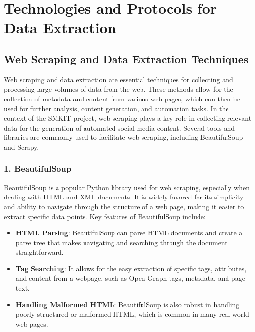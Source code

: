 \section{Technologies and Protocols for Data Extraction}
\label{sec:technologies_and_protocols_for_data_extraction}

\subsection{Web Scraping and Data Extraction Techniques}
\label{subsec:web_scraping_and_data_extraction_techniques}

Web scraping and data extraction are essential techniques for collecting and processing large volumes of data from the web. These methods allow for the collection of metadata and content from various web pages, which can then be used for further analysis, content generation, and automation tasks. In the context of the SMKIT project, web scraping plays a key role in collecting relevant data for the generation of automated social media content. Several tools and libraries are commonly used to facilitate web scraping, including BeautifulSoup and Scrapy.

\subsubsection{1. BeautifulSoup}

BeautifulSoup is a popular Python library used for web scraping, especially when dealing with HTML and XML documents. It is widely favored for its simplicity and ability to navigate through the structure of a web page, making it easier to extract specific data points. Key features of BeautifulSoup include:

\begin{itemize}
    \item \textbf{HTML Parsing}: BeautifulSoup can parse HTML documents and create a parse tree that makes navigating and searching through the document straightforward.
    \item \textbf{Tag Searching}: It allows for the easy extraction of specific tags, attributes, and content from a webpage, such as Open Graph tags, metadata, and page text.
    \item \textbf{Handling Malformed HTML}: BeautifulSoup is also robust in handling poorly structured or malformed HTML, which is common in many real-world web pages.
\end{itemize}

